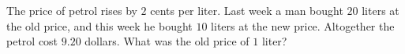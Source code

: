 The price of petrol rises by $2$ cents per liter. Last week a man bought $20$ liters at the old price, and this week he bought $10$ liters at the new price. Altogether the petrol cost $9.20$ dollars. What was the old price of $1$ liter?
